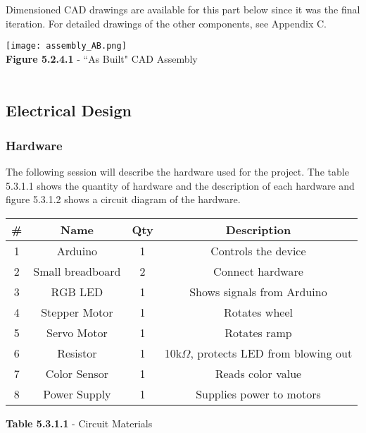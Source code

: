 \documentclass{article}
\begin{document}
Dimensioned CAD drawings are available for this part below since it was the final iteration. For detailed drawings of the other components, see Appendix C.

\begin{center}
    \texttt{[image: assembly\_AB.png]}\\
    \small{\textbf{Figure 5.2.4.1} - ``As Built" CAD Assembly}\\~\\
\end{center}

\subsection{Electrical Design}
\subsubsection{Hardware}

    The following session will describe the hardware used for the project. The table 5.3.1.1 shows the quantity of hardware and the description of each hardware and figure 5.3.1.2 shows a circuit diagram of the hardware.
    
    \begin{center}
    \begin{tabular}{|c|c|c|c|}
    \hline
       \textbf{\#}  & \textbf{Name} & \textbf{Qty} & \textbf{Description}  \\
       \hline
        1 & Arduino & 1 & Controls the device\\
        2 & Small breadboard & 2 & Connect hardware\\
        3 &  RGB LED & 1 & Shows signals from Arduino\\
        4 & Stepper Motor & 1 & Rotates wheel \\
        5 & Servo Motor & 1 & Rotates ramp \\
        6 & Resistor & 1 & 10k$\Omega$, protects LED from blowing out\\ 
        7 & Color Sensor & 1& Reads color value \\
        8 & Power Supply & 1 & Supplies power to motors\\
        \hline
    \end{tabular}
    
    \small{\textbf{Table 5.3.1.1} - Circuit Materials}\\~\\
    
    \end{center}
\end{document}
